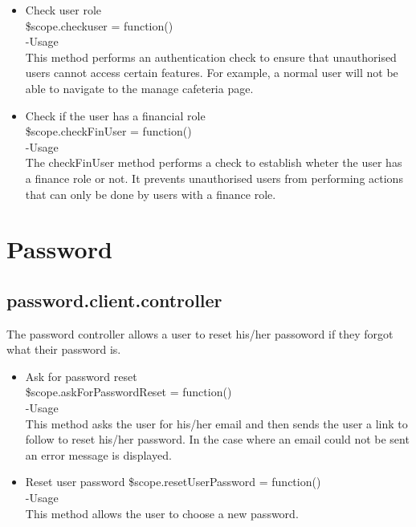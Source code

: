 \documentclass[a4paper,12pt]{article}
\begin{document}
\begin{itemize}
\item Check user role\\
 \$scope.checkuser = function()\\
-Usage\\
This method performs an authentication check to ensure that unauthorised users cannot access certain features. For example, a normal user will not be able to navigate to the manage cafeteria page.

\item Check if the user has a financial role\\
 \$scope.checkFinUser = function()\\
-Usage\\
The checkFinUser method performs a check to establish wheter the user has a finance role or not. It prevents unauthorised users from performing actions that can only be done by users with a finance role.
 \end{itemize}
 \section{Password}
 \subsection{password.client.controller}
 The password controller allows a user to reset his/her passoword if they forgot what their password is. 
 \begin{itemize}
\item Ask for password reset\\
  \$scope.askForPasswordReset = function()\\
 -Usage\\
 This method asks the user for his/her email and then sends the user a link to follow to reset his/her password. In the case where an email could not be sent an error message is displayed.
 \item Reset user password
  \$scope.resetUserPassword = function()\\
 -Usage\\
 This method allows the user to choose a new password.
 \end{itemize}
 
\end{document}
